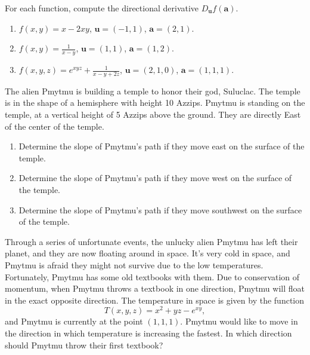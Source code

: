 \documentclass{ximera}
\begin{document}
\begin{problem}
For each function, compute the directional derivative $D_\mathbf{u}f(\mathbf{a})$.

\begin{enumerate}

\item $f(x,y) = x-2xy$, $\mathbf{u} = (-1,1)$, $\mathbf{a} = (2,1)$. 

\item $f(x,y) = \frac{1}{x-y}$, $\mathbf{u} = (1,1)$, $\mathbf{a} = (1,2)$.

\item $f(x,y,z) = e^{xyz}+\frac{1}{x-y+2z}$, $\mathbf{u} = (2,1,0)$, $\mathbf{a} = (1,1,1)$.
\end{enumerate}

\end{problem}

\begin{problem}
The alien Pmytmu is building a temple to honor their god, Suluclac. The temple is in the shape of a hemisphere with height 10 Azzips. Pmytmu is standing on the temple, at a vertical height of 5 Azzips above the ground. They are directly East of the center of the temple.
\begin{enumerate}
\item Determine the slope of Pmytmu's path if they move east on the surface of the temple.
\item Determine the slope of Pmytmu's path if they move west on the surface of the temple.
\item Determine the slope of Pmytmu's path if they move southwest on the surface of the temple.
\end{enumerate}
\end{problem}

\begin{problem}
 Through a series of unfortunate events, the unlucky alien Pmytmu has left their planet, and they are now floating around in space. It's very cold in space, and Pmytmu is afraid they might not survive due to the low temperatures. Fortunately, Pmytmu has some old textbooks with them. Due to conservation of momentum, when Pmytmu throws a textbook in one direction, Pmytmu will float in the exact opposite direction. The temperature in space is given by the function
\[
T(x,y,z) = x^2+yz -e^{xy},
\]
and Pmytmu is currently at the point $(1,1,1)$. Pmytmu would like to move in the direction in which temperature is increasing the fastest. In which direction should Pmytmu throw their first textbook?
\end{problem}
\end{document}
